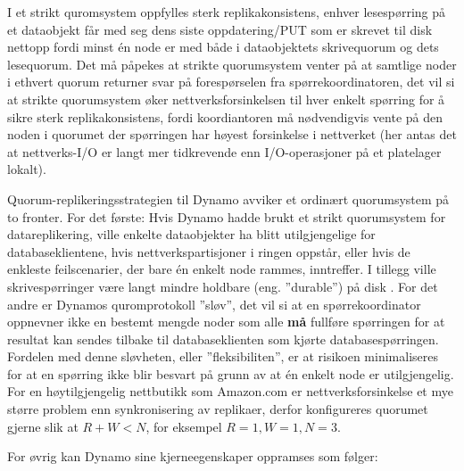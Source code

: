 I et strikt quromsystem oppfylles sterk replikakonsistens, enhver lesespørring på et dataobjekt får med seg dens siste oppdatering/PUT som er skrevet til disk nettopp fordi minst én node er med både i dataobjektets skrivequorum og dets lesequorum. Det må påpekes at strikte quorumsystem venter på at samtlige noder i ethvert quorum returner svar på forespørselen fra spørrekoordinatoren, det vil si at strikte quorumsystem øker nettverksforsinkelsen til hver enkelt spørring for å sikre sterk replikakonsistens, fordi koordiantoren må nødvendigvis vente på den noden i quorumet der spørringen har høyest forsinkelse i nettverket (her antas det at nettverks-I/O er langt mer tidkrevende enn I/O-operasjoner på et platelager lokalt).

Quorum-replikeringsstrategien til Dynamo avviker et ordinært quorumsystem på to fronter. For det første: Hvis Dynamo hadde brukt et strikt quorumsystem for datareplikering, ville enkelte dataobjekter ha blitt utilgjengelige for databaseklientene, hvis nettverkspartisjoner i ringen oppstår, eller hvis de enkleste feilscenarier, der bare én enkelt node rammes, inntreffer. I tillegg ville skrivespørringer være langt mindre holdbare (eng. ''durable'') på disk \citep{decandia2007}. For det andre er Dynamos quromprotokoll ''sløv'', det vil si at en spørrekoordinator oppnevner ikke en bestemt mengde noder som alle \textbf{må} fullføre spørringen for at resultat kan sendes tilbake til databaseklienten som kjørte databasespørringen. Fordelen med denne sløvheten, eller ''fleksibiliten'', er at risikoen minimaliseres for at en spørring ikke blir besvart på grunn av at én enkelt node er utilgjengelig. For en høytilgjengelig nettbutikk som Amazon.com er nettverksforsinkelse et mye større problem enn synkronisering av replikaer, derfor konfigureres quorumet gjerne slik at \(R + W < N\), for eksempel \(R = 1, W =1, N = 3\).

For øvrig kan Dynamo sine kjerneegenskaper oppramses som følger:

